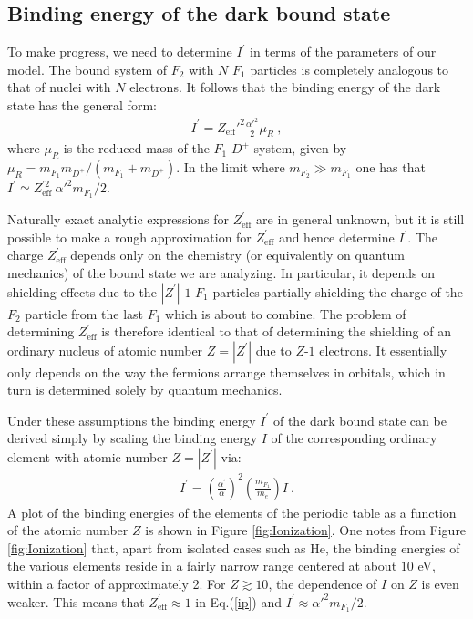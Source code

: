 \documentclass[12pt]{article}
\begin{document}
\subsection{Binding energy of the dark bound state}

To make progress, we need to determine $I ^{'}$ in terms of the parameters of our model. The bound system of $F _2$ with $N$ $F _1$ particles is completely analogous to that of nuclei with $N$ electrons. It follows that the binding energy of the dark state has the general form:
%
\begin{eqnarray}
I ^{'} = {Z _{\text{eff}}'} ^2 \frac{\alpha '^{2}}{2} \mu _R \ ,
\label{ip}
\end{eqnarray} 
%
where $\mu _R$ is the reduced mass of the $F_1$-$D ^+$ system, given by $\mu _R = m _{F_1}m _{D ^+}/(m _{F_1} + m _{D ^+})$. In the limit where $m _{F_2} \gg m _{F_1}$ one has that $I ^{'} \simeq Z _{\text{eff}} ^{'2} \ {\alpha '} ^2 m _{F_1}/2$.

Naturally exact analytic expressions for $Z _{\text{eff}} ^{'}$ are in general unknown, but it is still possible to make a rough approximation for $Z ^{'} _{\text{eff}}$ and hence determine $I ^{'}$. The charge $Z _{\text{eff}} ^{'}$ depends only on the chemistry (or equivalently on quantum mechanics) of the bound state we are analyzing. In particular, it depends on shielding effects due to the $|Z ^{'}|$-$1$ $F _1$ particles partially shielding the charge of the $F _2$ particle from the last $F _1$ which is about to combine. The problem of determining $Z _{\text{eff}} ^{'}$ is therefore identical to that of determining the shielding of an ordinary nucleus of atomic number $Z = |Z ^{'}|$ due to $Z$-$1$ electrons. It essentially only depends on the way the fermions arrange themselves in orbitals, which in turn is determined solely by quantum mechanics.

Under these assumptions the binding energy $I ^{'}$ of the dark bound state can be derived simply by scaling the binding energy $I$ of the corresponding ordinary element with atomic number $Z = |Z ^{'}|$ via:
%
\begin{eqnarray}
I ^{'} = \left ( \frac{\alpha ^{'}}{\alpha} \right ) ^2 \left ( \frac{m _{F_1}}{m _e} \right ) I \ .
\label{scaling}
\end{eqnarray}
%
A plot of the binding energies of the elements of the periodic table as a function of the atomic number $Z$ is shown in Figure \ref{fig:Ionization}. One notes from Figure \ref{fig:Ionization} that, apart from isolated cases such as He, the binding energies of the various elements reside in a fairly narrow range centered at about $10$ eV, within a factor of approximately 2. For $Z \gtrsim 10$, the dependence of $I$ on $Z$ is even weaker. This means that $Z _{\text{eff}} ^{'} \approx 1$ in Eq.(\ref{ip}) and $I ^{'} \approx {\alpha '} ^2m _{F_1}/2$.
\end{document}
